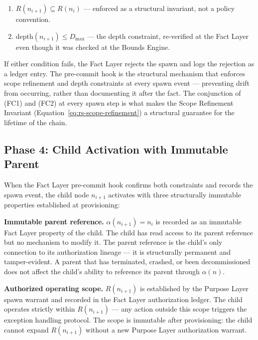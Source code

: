 \begin{enumerate}
    \item[(FC1)] $R(n_{i+1}) \subseteq R(n_i)$ — enforced as a structural invariant, not a policy convention.
    \item[(FC2)] $\text{depth}(n_{i+1}) \leq D_{\max}$ — the depth constraint, re-verified at the Fact Layer even though it was checked at the Bounds Engine.
\end{enumerate}

If either condition fails, the Fact Layer rejects the spawn and logs the rejection as a ledger entry. The pre-commit hook is the structural mechanism that enforces scope refinement and depth constraints at every spawn event — preventing drift from occurring, rather than documenting it after the fact. The conjunction of (FC1) and (FC2) at every spawn step is what makes the Scope Refinement Invariant (Equation~\ref{eq:rs-scope-refinement}) a structural guarantee for the lifetime of the chain.

\subsection{Phase 4: Child Activation with Immutable Parent}
\label{sec:rs-phase4}

When the Fact Layer pre-commit hook confirms both constraints and records the spawn event, the child node $n_{i+1}$ activates with three structurally immutable properties established at provisioning:

\medskip
\noindent\textbf{Immutable parent reference.} $\alpha(n_{i+1}) = n_i$ is recorded as an immutable Fact Layer property of the child. The child has read access to its parent reference but no mechanism to modify it. The parent reference is the child's only connection to its authorization lineage — it is structurally permanent and tamper-evident. A parent that has terminated, crashed, or been decommissioned does not affect the child's ability to reference its parent through $\alpha(n)$.

\medskip
\noindent\textbf{Authorized operating scope.} $R(n_{i+1})$ is established by the Purpose Layer spawn warrant and recorded in the Fact Layer authorization ledger. The child operates strictly within $R(n_{i+1})$ — any action outside this scope triggers the exception handling protocol. The scope is immutable after provisioning: the child cannot expand $R(n_{i+1})$ without a new Purpose Layer authorization warrant.

